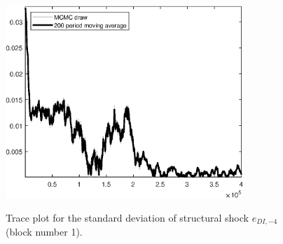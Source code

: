\begin{figure}[H]
\centering
  \includegraphics[width=0.8\textwidth]{BRS_sectoral/graphs/TracePlot_SE_e_DI_news_4_blck_1}\\
    \caption{Trace plot for the standard deviation of structural shock ${e_{DI,-4}}$ (block number 1).}
\end{figure}
